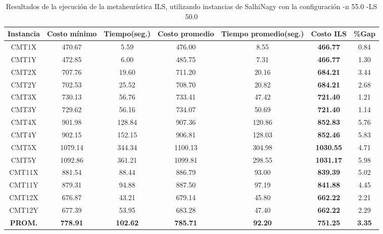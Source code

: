 \begin{table}[ht]
\caption{Resultados de la ejecución de la metaheurística ILS, utilizando instancias de SalhiNagy con la configuración -n 55.0 -LS 50.0}
\centering
\small
\begin{tabular}{c c c c c c c}
\hline\hline
Instancia & Costo mínimo & Tiempo(seg.) & Costo promedio & Tiempo promedio(seg.) & Costo ILS & \%Gap \\ [0.5ex]
\hline
CMT1X & 470.67 & 5.59 & 
476.00 & 8.55 & \bf{466.77} & 
0.84\\CMT1Y & 472.85 & 6.00 & 
485.75 & 7.31 & \bf{466.77} & 
1.30\\CMT2X & 707.76 & 19.60 & 
711.20 & 20.16 & \bf{684.21} & 
3.44\\CMT2Y & 702.53 & 25.52 & 
708.70 & 20.82 & \bf{684.21} & 
2.68\\CMT3X & 730.13 & 56.76 & 
733.41 & 47.42 & \bf{721.40} & 
1.21\\CMT3Y & 729.62 & 56.16 & 
734.07 & 50.69 & \bf{721.40} & 
1.14\\CMT4X & 901.98 & 128.84 & 
907.36 & 120.86 & \bf{852.83} & 
5.76\\CMT4Y & 902.15 & 152.15 & 
906.81 & 128.03 & \bf{852.46} & 
5.83\\CMT5X & 1079.14 & 344.34 & 
1100.13 & 304.98 & \bf{1030.55} & 
4.71\\CMT5Y & 1092.86 & 361.21 & 
1099.81 & 298.55 & \bf{1031.17} & 
5.98\\CMT11X & 881.54 & 88.44 & 
886.79 & 93.00 & \bf{839.39} & 
5.02\\CMT11Y & 879.31 & 94.88 & 
887.50 & 97.19 & \bf{841.88} & 
4.45\\CMT12X & 676.87 & 43.21 & 
679.14 & 45.80 & \bf{662.22} & 
2.21\\CMT12Y & 677.39 & 53.95 & 
683.28 & 47.40 & \bf{662.22} & 
2.29\\\bf{PROM.} & 
\bf{778.91} & \bf{102.62} & \bf{785.71} & \bf{92.20} & \bf{751.25} & \bf{3.35}\\[1ex]\hline
\end{tabular}
\label{table:nonlin}
\end{table} \clearpage
